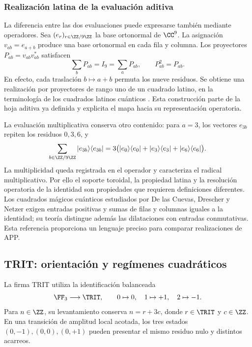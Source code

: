 \subsubsection{Realización latina de la evaluación aditiva}

La diferencia entre las dos evaluaciones puede expresarse también mediante
operadores. Sea \((e_r)_{r\in\ZZ/9\ZZ}\) la base ortonormal de \(\CC^9\).
La asignación \(v_{ab}=e_{a+b}\) produce una base ortonormal en cada fila
y columna. Los proyectores \(P_{ab}=v_{ab}v_{ab}^{*}\) satisfacen
\[
 \sum_bP_{ab}=I_9=\sum_aP_{ab},\qquad P_{ab}^2=P_{ab}.
\]
En efecto, cada traslación \(b\mapsto a+b\) permuta los nueve residuos.
Se obtiene una realización por proyectores de rango uno de un cuadrado
latino, en la terminología de los cuadrados latinos cuánticos
\cite{x_reciprocidad:mustovicary,x_reciprocidad:delascuevas2023}. Esta construcción parte de la hoja
aditiva ya definida y explicita el mapa hacia su representación operatoria.

La evaluación multiplicativa conserva otro contenido: para \(a=3\), los
vectores \(e_{3b}\) repiten los residuos \(0,3,6\), y
\[
 \sum_{b\in\ZZ/9\ZZ}|e_{3b}\rangle\langle e_{3b}|
 =3\bigl(|e_0\rangle\langle e_0|+|e_3\rangle\langle e_3|
                    +|e_6\rangle\langle e_6|\bigr).
\]
La multiplicidad queda registrada en el operador y caracteriza el radical
multiplicativo. Por ello el soporte toroidal, la propiedad latina y la
resolución operatoria de la identidad son propiedades que requieren
definiciones diferentes. Los cuadrados mágicos cuánticos estudiados por
De las Cuevas, Drescher y Netzer exigen entradas positivas y sumas de filas
y columnas iguales a la identidad; su teoría distingue además las
dilataciones con entradas conmutativas\cite{x_reciprocidad:delascuevas2020}. Esta referencia
proporciona un lenguaje preciso para comparar realizaciones de APP.

\subsection{TRIT: orientación y regímenes cuadráticos}

\begin{definition}
La firma TRIT utiliza la identificación balanceada
\[
 \FF_3\longrightarrow\TRIT,\qquad 0\mapsto0,\quad1\mapsto+1,\quad2\mapsto-1.
\]
Para \(n\in\ZZ\), su levantamiento conserva \(n=r+3c\), donde \(r\in\TRIT\) y \(c\in\ZZ\). En una transición de amplitud local acotada, los tres estados \((0,-1),(0,0),(0,+1)\) pueden presentar el mismo residuo nulo y distintos acarreos.
\end{definition}

